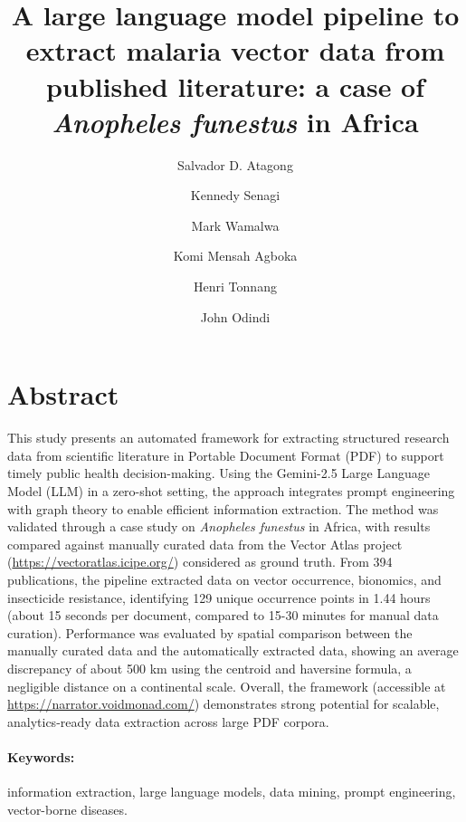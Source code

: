 \documentclass{article}
\title{A large language model pipeline to extract malaria vector data from 
published literature: a case of \textit{Anopheles funestus} in Africa}
\author[1,2]{Salvador D. Atagong}
\author[1]{Kennedy Senagi}
\author[1]{Mark Wamalwa}
\author[1]{Komi Mensah Agboka}
\author[2,3]{Henri Tonnang}
\author[2]{John Odindi}
\affil[1]{International Center of Insect Physiology and Ecology (ICIPE)}
\affil[2]{University of KwaZulu-Natal, South Africa}
\affil[3]{International Institute of Tropical Agriculture (IITA), Ibadan, Nigeria}
\date{}
\begin{document}
\maketitle

\section{Abstract}
This study presents an automated framework for extracting structured research data from scientific 
literature in Portable Document Format (PDF) to support timely public health decision-making. Using 
the Gemini-2.5 Large Language Model (LLM) in a zero-shot setting, the approach integrates prompt 
engineering with graph theory to enable efficient information extraction. The method was validated 
through a case study on \textit{Anopheles funestus} in Africa, with results compared against manually 
curated data from the Vector Atlas project (\url{https://vectoratlas.icipe.org/}) considered as ground 
truth. From 394 publications, the pipeline extracted data on vector occurrence, bionomics, and insecticide 
resistance, identifying 129 unique occurrence points in 1.44 hours (about 15 seconds per document, compared 
to 15-30 minutes for manual data curation). Performance was evaluated by spatial comparison between the 
manually curated data and the automatically extracted data, showing an average discrepancy of about 500 km 
using the centroid and haversine formula, a negligible distance on a continental scale. Overall, the 
framework (accessible at \url{https://narrator.voidmonad.com/}) demonstrates strong potential for 
scalable, analytics-ready data extraction across large PDF corpora. 

\paragraph{Keywords:} information extraction, large language models, data mining, prompt engineering, vector-borne diseases.
\end{document}
